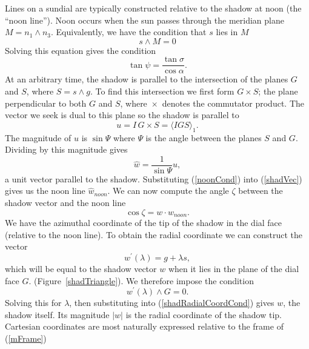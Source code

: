 \documentclass[12pt]{article}
\newcommand{\dt}{\! \cdot \!}
\newcommand{\wdg}{\! \wedge \!}
\newcommand{\crs}{\! \times \!}
\newcommand{\la}{\langle}
\newcommand{\ra}{\rangle}
\newcommand{\what}{\hat{w}}
\begin{document}
Lines on a sundial are typically constructed relative to the shadow at noon (the ``noon line''). Noon occurs when the sun passes through the meridian plane $M=n_1 \wdg n_3$. 
Equivalently, we have the condition that $s$ lies in $M$
%
\begin{equation}
s \wdg M = 0
\end{equation}
%
Solving this equation gives the condition
%
\begin{equation} \label{noonCond}
\tan\psi = \frac{ \tan\sigma }{ \cos\alpha }.
\end{equation}
%
At an arbitrary time, the shadow is parallel to the intersection of the planes $G$ and $S$, where $S = s \wdg g$. To find this intersection we first form $G \crs S$; the plane perpendicular to both $G$ and $S$, where $\crs$ denotes the commutator product. The vector we seek is dual to this plane so the shadow is parallel to
%
\begin{equation} \label{shadVec1}
u = I\, G\crs S = \la IGS \ra_1.
\end{equation}
%
The magnitude of $u$ is $\sin \Psi$ where $\Psi$ is the angle between the planes $S$ and $G$. Dividing by this magnitude gives
%
\begin{equation} \label{shadVec}
\what = \frac{1}{\sin\Psi} u,
\end{equation}
%
a unit vector parallel to the shadow. Substituting (\ref{noonCond}) into (\ref{shadVec}) gives us the noon line $\what_{noon}$. We can now compute the angle $\zeta$ between the shadow vector and the noon line
%
\begin{equation} \label{shadBearing}
\cos\zeta = w \dt w_{noon}.
\end{equation}
%
We have the azimuthal coordinate of the tip of the shadow in the dial face (relative to the noon line). To obtain the radial coordinate we can construct the vector
%
\begin{equation} \label{shadRadialCoordCond}
w^\prime(\lambda) = g + \lambda s,
\end{equation}
%
which will be equal to the shadow vector $w$ when it lies in the plane of the dial face $G$. (Figure~\ref{shadTriangle}). We therefore impose the condition
%
\begin{equation}
w^\prime(\lambda) \wdg G = 0.
\end{equation}
%
Solving this for $\lambda$, then substituting into (\ref{shadRadialCoordCond}) gives $w$, the shadow itself. Its magnitude $|w|$ is the radial coordinate of the shadow tip. Cartesian coordinates are most naturally expressed relative to the frame of (\ref{mFrame})
\end{document}

